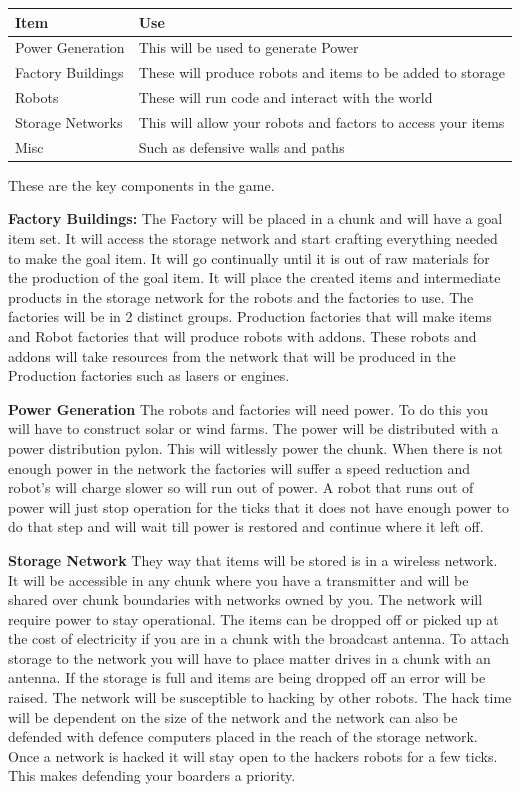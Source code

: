 \documentclass[12pt]{article}
\begin{document}
\begin{tabular}{l | l}
Item & Use \\
\hline
Power Generation & This will be used to generate Power\\
Factory Buildings & These will produce robots and items to be added to storage\\
Robots & These will run code and interact with the world\\
Storage Networks & This will allow your robots and factors to access your items\\
Misc & Such as defensive walls and paths
\end{tabular}

These are the key components in the game.

\textbf{Factory Buildings:}\newline
The Factory will be placed in a chunk and will have a goal item set. It will access the storage network and start crafting everything needed to make the goal item. It will go continually until it is out of raw materials for the production of the goal item. It will place the created items and intermediate products in the storage network for the robots and the factories to use. The factories will be in 2 distinct groups. Production factories that will make items and Robot factories that will produce robots with addons. These robots and addons will take resources from the network that will be produced in the Production factories such as lasers or engines.

\textbf{Power Generation}\newline
The robots and factories will need power. To do this you will have to construct solar or wind farms. The power will be distributed with a power distribution pylon. This will witlessly power the chunk. When there is not enough power in the network the factories will suffer a speed reduction and robot's will charge slower so will run out of power. A robot that runs out of power will just stop operation for the ticks that it does not have enough power to do that step and will wait till power is restored and continue where it left off.

\textbf{Storage Network}\newline
They way that items will be stored is in a wireless network. It will be accessible in any chunk where you have a transmitter and will be shared over chunk boundaries with networks owned by you. The network will require power to stay operational. The items can be dropped off or picked up at the cost of electricity if you are in a chunk with the broadcast antenna. To attach storage to the network you will have to place matter drives in a chunk with an antenna. If the storage is full and items are being dropped off an error will be raised. The network will be susceptible to hacking by other robots. The hack time will be dependent on the size of the network and the network can also be defended with defence computers placed in the reach of the storage network. Once a network is hacked it will stay open to the hackers robots for a few ticks. This makes defending your boarders a priority.
\end{document}
